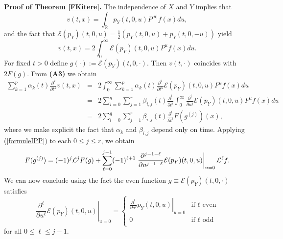 \documentclass[a4paper, 11pt]{article}
\newcommand{\R}{\mathbb{R}}
\newcommand{\1}{\mathbf{1}}
\begin{document}
\noindent\textbf{Proof of Theorem \ref{FKitere}.}
The independence of $X$ and $Y$ implies that
\begin{equation*}
v(t,x)=\int_\R p_Y(t,0,u)P^{|u|}f(x)du,
\end{equation*}
and the fact that $\mathcal{E}(p_Y)(t,0,u)=\frac{1}{2}(p_Y(t,0,u)+p_Y(t,0,-u))$ yield
\begin{equation}
v(t,x)=2\int_0^\infty \mathcal{E}(p_Y)(t,0,u)P^uf(x)du. 
\end{equation}
For fixed $t>0$ define $g(\cdot):=\mathcal{E}(p_Y)(t,0,\cdot)$. Then $v(t,\cdot)$ coincides with $2F(g)$. From {\bf (A3)} we obtain
\begin{eqnarray*}
\sum_{k=1}^{p} \alpha_k(t)\frac{\partial^k}{\partial t^k}v(t,x)&=&2\int_0^\infty \sum_{k=1}^{p} \alpha_k(t)\frac{\partial^k}{\partial t^k}\mathcal{E}(p_Y)(t,0,u)P^u f(x)du\nonumber \\
&=&2\sum_{i=0}^{q}\sum_{j=1}^{r} \beta_{i,j}(t)\frac{\partial^i}{\partial t^i}\int_0^\infty \frac{\partial^j}{\partial u^j}\mathcal{E}(p_Y)(t,0,u)P^u f(x)du\\
&=& 2\sum_{i=0}^{q}\sum_{j=1}^{r} \beta_{i,j}(t)\frac{\partial^i}{\partial t^i} F(g^{(j)})(x),\label{intermediaire}
\end{eqnarray*}
where we make explicit the fact that $\alpha_k$ and $\beta_{i,j}$ depend only on time. Applying (\ref{formuleIPP}) to each $0\leq j\leq r$, we obtain
\begin{equation*}
F(g^{(j)})=(-1)^j{\cal L}^j F(g)+\sum_{\ell=0}^{j-1}(-1)^{\ell+1}\left. \frac{\partial^{j-1-\ell}}{\partial u^{j-1-\ell}}\mathcal{E}(p_Y)(t,0,u)\right|_{u=0}\mathcal{L}^\ell f.
\end{equation*}
We can now conclude using the fact the even function $g\equiv \mathcal{E}(p_Y)(t,0,\cdot)$ satisfies 
\begin{equation*}
\left. \frac{\partial^\ell}{\partial u^\ell}\mathcal{E}(p_Y)(t,0,u)\right|_{u=0}=
\left\lbrace 
\begin{array}{lcl}
\left. \frac{\partial^\ell}{\partial u^\ell}p_Y(t,0,u)\right|_{u=0} &\text{if $\ell$ even}\\ 
0 & \text{if $\ell$ odd}\\
\end{array}\right.
\end{equation*}
for all $0\leq \ell\leq j-1$. 
\hfill \framebox[0.6em]\\



\bigskip
\end{document}
